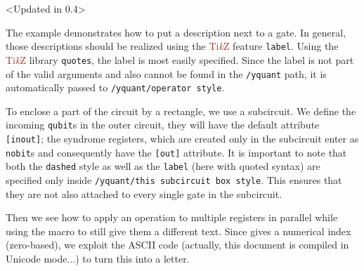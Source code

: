 \documentclass{scrartcl}
\makeatletter
\newenvironment{codeexample*}{%
   \VerbatimEnvironment%
   \let\FVB@VerbatimOut\minted@FVB@VerbatimOut
   \let\FVE@VerbatimOut\minted@FVE@VerbatimOut
   \minted@configlang{tex}%
   \minted@fvset
   \begin{VerbatimOut}[codes={\catcode`\^^I=12},firstline,lastline]{\minted@jobname.pyg}%
}{
   \end{VerbatimOut}%
   \minted@langlinenoson%
   \begin{adjustbox}{center}
       \minted@jobname.pyg %
   \end{adjustbox}\nopagebreak
   \expandafter\minted@pygmentize\expandafter{\minted@lang}%
   \minted@langlinenosoff%
   \par%
}
\def\TikZ{\textcolor{brown}{Ti\textit kZ}}
\def\ttlink{\link\texttt}
\def\texlink{\link\tex}
\makeatother
\begin{document}
            \begin{example}<Updated in 0.4>
               \begin{codeexample*}
               \end{codeexample*}
               The example demonstrates how to put a description next to a gate.
               In general, those descriptions should be realized using the \TikZ{} feature \texttt{label}.
               Using the \TikZ{} library \texttt{quotes}, the label is most easily specified.
               Since the label is not part of the valid arguments and also cannot be found in the \texttt{/yquant} path, it is automatically passed to \ttlink{/yquant/operator style}.

               To enclose a part of the circuit by a rectangle, we use a subcircuit.
               We define the incoming \ttlink{qubit}s in the outer circuit, they will have the default attribute \ttlink{[inout]}; the syndrome registers, which are created only in the subcircuit enter as \ttlink{nobit}s and consequently have the \ttlink{[out]} attribute.
               It is important to note that both the \texttt{dashed} style as well as the \texttt{label} (here with quoted syntax) are specified only inside \ttlink{/yquant/this subcircuit box style}.
               This ensures that they are not also attached to every single gate in the subcircuit.

               Then we see how to apply an operation to multiple registers in parallel while using the \texlink{\idx} macro to still give them a different text.
               Since \texlink{\idx} gives a numerical index (zero\hyp based), we exploit the ASCII code (actually, this document is compiled in Unicode mode...) to turn this into a letter.


\end{example}
\end{document}
